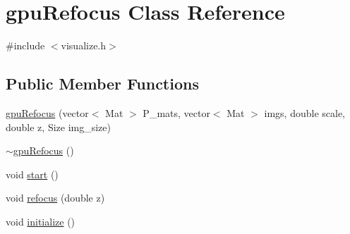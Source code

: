 \hypertarget{classgpuRefocus}{\section{gpu\-Refocus Class Reference}
\label{df/d10/classgpuRefocus}
}


{\ttfamily \#include $<$visualize.\-h$>$}

\subsection*{Public Member Functions}
\begin{DoxyCompactItemize}
\item 
\hyperlink{classgpuRefocus_ab2f0271a5c8cb33ee6d1e3ae5d78ed21}{gpu\-Refocus} (vector$<$ Mat $>$ P\-\_\-mats, vector$<$ Mat $>$ imgs, double scale, double z, Size img\-\_\-size)
\item 
\hyperlink{classgpuRefocus_a1f4f716c2408873fd1f25f47affee82d}{$\sim$gpu\-Refocus} ()
\item 
void \hyperlink{classgpuRefocus_a28d7d0f0604bd683069857b1face4e6e}{start} ()
\item 
void \hyperlink{classgpuRefocus_a0722e109830d8de6ff53c0e8e8f73891}{refocus} (double z)
\item 
void \hyperlink{classgpuRefocus_a656c1de1bf678f3250e01763ea5748ab}{initialize} ()
\end{DoxyCompactItemize}


